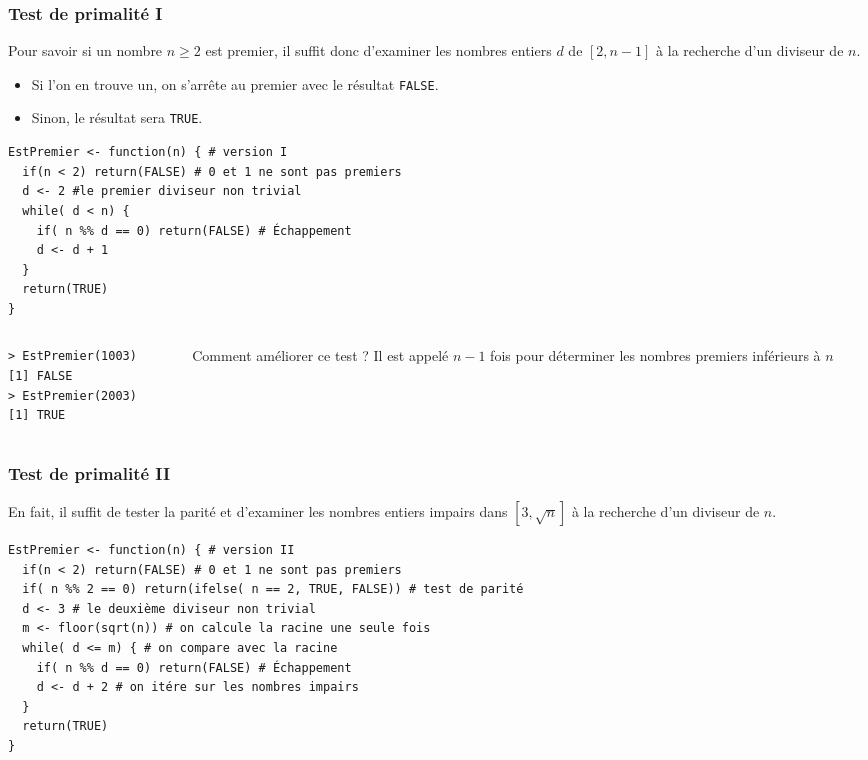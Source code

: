 \documentclass[10pt]{beamer}
\begin{document}
\begin{frame}[fragile]
  \frametitle{Test de primalité I}
  Pour savoir si un nombre $n \geq 2$ est premier, il suffit donc d'examiner les nombres entiers $d$ de $[2,n-1]$ à la recherche d'un diviseur de $n$.
  \begin{itemize}
  \item Si l'on en trouve un, on s'arrête au premier avec le résultat \texttt{FALSE}.
  \item Sinon, le résultat sera \texttt{TRUE}.
  \end{itemize}
  \begin{lstlisting}[style=editor]
EstPremier <- function(n) { # version I
  if(n < 2) return(FALSE) # 0 et 1 ne sont pas premiers
  d <- 2 #le premier diviseur non trivial
  while( d < n) {
    if( n %% d == 0) return(FALSE) # Échappement
    d <- d + 1
  }
  return(TRUE)
}
\end{lstlisting}


\begin{columns}[t]
\begin{column}{0.4\textwidth}
  \begin{lstlisting}
> EstPremier(1003)
[1] FALSE
> EstPremier(2003)
[1] TRUE
  \end{lstlisting}
\end{column}
\begin{column}{0.6\textwidth}

\begin{block}{Comment améliorer ce test ?}
  Il est appelé $n-1$ fois pour déterminer les nombres premiers inférieurs à $n$
\end{block}
\end{column}
\end{columns}

\end{frame}


\begin{frame}[fragile]
  \frametitle{Test de primalité II}
  En fait, il suffit \alert{de tester la parité et d'examiner les nombres entiers impairs dans $\left[3,\sqrt{n}\right]$} à la recherche d'un diviseur de $n$.

  \begin{lstlisting}[style=editor]
EstPremier <- function(n) { # version II
  if(n < 2) return(FALSE) # 0 et 1 ne sont pas premiers
  if( n %% 2 == 0) return(ifelse( n == 2, TRUE, FALSE)) # test de parité
  d <- 3 # le deuxième diviseur non trivial
  m <- floor(sqrt(n)) # on calcule la racine une seule fois
  while( d <= m) { # on compare avec la racine
    if( n %% d == 0) return(FALSE) # Échappement
    d <- d + 2 # on itére sur les nombres impairs
  }
  return(TRUE)
}
\end{lstlisting}

\end{frame}
\end{document}

